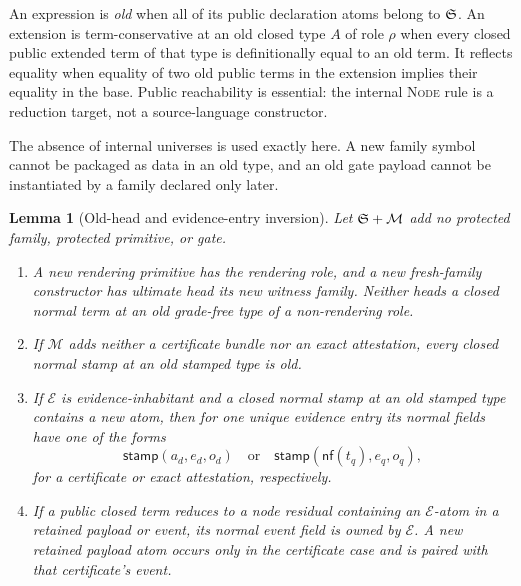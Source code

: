 \documentclass[11pt]{article}
\numberwithin{equation}{section}
\theoremstyle{definition}
\theoremstyle{plain}
\newtheorem{lemma}[definition]{Lemma}
\theoremstyle{remark}
\newcommand{\nf}{\mathsf{nf}}
\begin{document}
An expression is \emph{old} when all of its public declaration atoms belong to
\({\mathfrak S}\).  An extension is term-conservative at an old closed type \(A\)
of role \(\rho\) when every closed public extended term of that type is
definitionally equal to an old term.  It reflects equality when equality of
two old public terms in the extension implies their equality in the base.
Public reachability is essential: the internal \textsc{Node} rule is a
reduction target, not a source-language constructor.

The absence of internal universes is used exactly here.  A new family symbol
cannot be packaged as data in an old type, and an old gate payload cannot be
instantiated by a family declared only later.

\begin{lemma}[Old-head and evidence-entry inversion]\label{lem:extension-inversion}
Let \({\mathfrak S}+\mathcal M\) add no protected family, protected primitive, or
gate.
\begin{enumerate}[label=(\roman*),leftmargin=2.5em]
\item A new rendering primitive has the rendering role, and a new
fresh-family constructor has ultimate head its new witness family.  Neither
heads a closed normal term at an old grade-free type of a non-rendering
role.
\item If \(\mathcal M\) adds neither a certificate bundle nor an exact
attestation, every closed normal stamp at an old stamped type is old.
\item If \(\mathcal E\) is evidence-inhabitant and a closed normal stamp at
an old stamped type contains a new atom, then for one unique evidence entry
its normal fields have one of the forms
\[
 \mathsf{stamp}(a_d,e_d,o_d)
 \quad\text{or}\quad
 \mathsf{stamp}(\nf(t_q),e_q,o_q),
\]
for a certificate or exact attestation, respectively.
\item If a public closed term reduces to a node residual containing an
\(\mathcal E\)-atom in a retained payload or event, its normal event field is
owned by \(\mathcal E\).  A new retained payload atom occurs only in the
certificate case and is paired with that certificate's event.
\end{enumerate}
\end{lemma}
\end{document}
